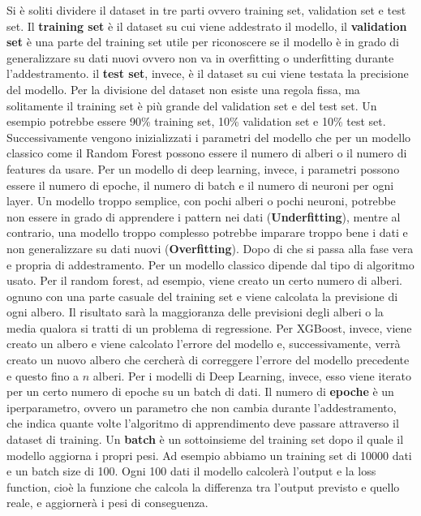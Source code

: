 \documentclass[12pt,a4paper,openright,twoside]{book}
\begin{document}
\noindent Si è soliti dividere il dataset in tre parti ovvero training set, validation set e test set.
Il \textbf{training set} è il dataset su cui viene addestrato
il modello, il \textbf{validation set} è una parte del training set
utile per riconoscere se il modello è in grado di generalizzare
su dati nuovi ovvero non va in overfitting o underfitting durante l'addestramento.
il \textbf{test set}, invece, è il dataset
su cui viene testata la precisione del modello.
Per la divisione del dataset non esiste una regola fissa,
ma solitamente il training set è più grande del validation set
e del test set. Un esempio potrebbe essere 90\% training set, 10\% validation set
e 10\% test set.
Successivamente vengono inizializzati i parametri del modello
che per un modello classico come il Random Forest
possono essere il numero di alberi o il numero di features da usare.
Per un modello di deep learning, invece, i parametri possono essere
il numero di epoche, il numero di batch e il numero di neuroni per ogni layer.
Un modello troppo semplice, con pochi alberi o pochi neuroni,
potrebbe non essere in grado di apprendere i pattern
nei dati (\textbf{Underfitting}), mentre al contrario,
una modello troppo complesso potrebbe imparare
troppo bene i dati e non generalizzare su dati nuovi
(\textbf{Overfitting}).
Dopo di che si passa alla fase vera e propria di addestramento.
Per un modello classico dipende dal tipo di algoritmo usato.
Per il random forest, ad esempio, viene creato un certo numero di alberi. ognuno con una parte casuale del training set
e viene calcolata la previsione di ogni albero.
Il risultato sarà la maggioranza delle previsioni degli alberi o la media qualora si tratti di un problema di regressione.
Per XGBoost, invece, viene creato un albero e
viene calcolato l'errore del modello e, successivamente, verrà creato un nuovo albero
che cercherà di correggere l'errore del modello precedente e questo fino a $n$ alberi.
Per i modelli di Deep Learning, invece, esso viene iterato per un certo numero di epoche su un batch di dati.
Il numero di \textbf{epoche} è un iperparametro, ovvero un parametro che non cambia durante l'addestramento, che indica quante volte
l'algoritmo di apprendimento deve passare attraverso il dataset di training\cite{brownlee2018difference}.
Un \textbf{batch} è un sottoinsieme del training set dopo il quale il modello
aggiorna i propri pesi. Ad esempio abbiamo un training set di 10000 dati
e un batch size di 100. Ogni 100 dati il modello calcolerà
l'output e la loss function, cioè la funzione che calcola
la differenza tra l'output previsto e quello reale, e aggiornerà i pesi di conseguenza.
\end{document}
